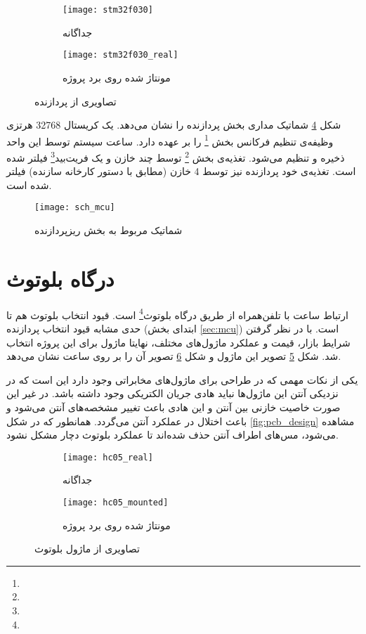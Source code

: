 \begin{figure}[h]
	\centering
	\begin{subfigure}{0.35\textwidth}
		\centering
		\texttt{[image: stm32f030]}
		\caption{جداگانه}
		\label{fig:stm32_image}
	\end{subfigure}
	\begin{subfigure}{0.35\textwidth}
		\centering
		\texttt{[image: stm32f030\_real]}
		\caption{مونتاژ شده روی برد پروژه}
		\label{fig:stm32_real}
	\end{subfigure}
	\caption{تصاویری از پردازنده }
	\label{fig:stm32}
\end{figure}

شکل \ref{fig:sch-mcu} شماتیک مداری بخش پردازنده را نشان می‌دهد. یک کریستال 32768 هرتزی وظیفه‌ی تنظیم فرکانس بخش
 \footnote{}
  را بر عهده دارد. ساعت سیستم توسط این واحد ذخیره و تنظیم می‌شود. تغذیه‌ی بخش 
  \footnote{}
  توسط چند خازن و یک فریت‌بید\footnote{} فیلتر شده است. تغذیه‌ی خود پردازنده نیز توسط 4 خازن (مطابق با دستور کارخانه سازنده) فیلتر شده است.

\begin{figure}
	\centering
	\texttt{[image: sch\_mcu]}
	\caption{شماتیک مربوط به بخش ریزپردازنده}
	\label{fig:sch-mcu}
\end{figure}


\section{درگاه بلوتوث}
ارتباط ساعت با تلفن‌همراه از طریق درگاه بلوتوث\footnote{} است. قیود انتخاب بلوتوث هم تا حدی مشابه قیود انتخاب پردازنده (ابتدای بخش \ref{sec:mcu}) است. با در نظر گرفتن شرایط بازار، قیمت و عملکرد ماژول‌های مختلف، نهایتا ماژول  برای این پروژه انتخاب شد. شکل \ref{fig:hc05_image} تصویر این ماژول و شکل \ref{fig:hc05_real} تصویر آن را بر روی \pcbf ساعت نشان می‌دهد.

یکی از نکات مهمی که در طراحی \pcbf برای ماژول‌های مخابراتی وجود دارد این است که در نزدیکی آنتن این ماژول‌ها نباید هادی جریان الکتریکی وجود داشته باشد. در غیر این صورت خاصیت خازنی بین آنتن و این هادی باعث تغییر مشخصه‌های آنتن می‌شود و باعث اختلال در عملکرد آنتن می‌گردد. همانطور که در شکل \ref{fig:pcb_design} مشاهده می‌شود، مس‌های اطراف آنتن  حذف شده‌اند تا عملکرد بلوتوث دچار مشکل نشود.

\begin{figure}[h]
	\centering
	\begin{subfigure}{0.45\textwidth}
		\centering
		\texttt{[image: hc05\_real]}
		\caption{جداگانه}
		\label{fig:hc05_image}
	\end{subfigure}
	\begin{subfigure}{0.45\textwidth}
		\centering
		\texttt{[image: hc05\_mounted]}
		\caption{مونتاژ شده روی برد پروژه}
		\label{fig:hc05_real}
	\end{subfigure}
	\caption{تصاویری از ماژول بلوتوث }
	\label{fig:hc05}
\end{figure}

